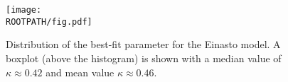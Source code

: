 \begin{figure}
	\centering%
	\texttt{[image: \\ROOTPATH/fig.pdf]}
	\caption{Distribution of the best-fit parameter for the Einasto model. A boxplot (above the histogram) is shown with a median value of $\kappa \approx 0.42$ and mean value $\kappa \approx 0.46$.}%
	\label{fig:parameter-distribution:einasto}%
\end{figure}